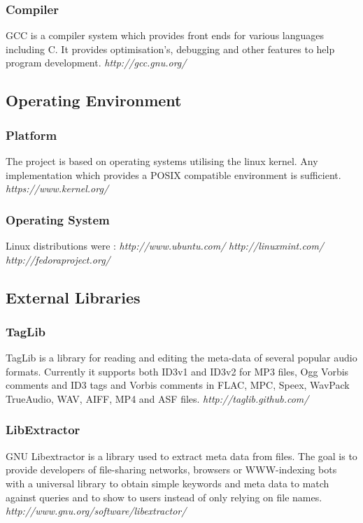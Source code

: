\subsubsection {Compiler}
GCC is a compiler system which provides front ends for various languages including C. It provides optimisation's, debugging and other features to help program development. \newline
\emph{http://gcc.gnu.org/}

\subsection {Operating Environment}
\subsubsection {Platform}
The project is based on operating systems utilising the linux kernel. Any implementation which provides a POSIX compatible environment is sufficient. \newline
\emph{https://www.kernel.org/}

\subsubsection {Operating System}
Linux distributions were : \newline
\emph{http://www.ubuntu.com/} \newline
\emph{http://linuxmint.com/} \newline
\emph{http://fedoraproject.org/}


\subsection {External Libraries}
\subsubsection{TagLib}
TagLib is a library for reading and editing the meta-data of several popular audio formats. Currently it supports both ID3v1 and ID3v2 for MP3 files, Ogg Vorbis comments and ID3 tags and Vorbis comments in FLAC, MPC, Speex, WavPack TrueAudio, WAV, AIFF, MP4 and ASF files. \newline
\emph{http://taglib.github.com/}

\subsubsection{LibExtractor}
GNU Libextractor is a library used to extract meta data from files. The goal is to provide developers of file-sharing networks, browsers or WWW-indexing bots with a universal library to obtain simple keywords and meta data to match against queries and to show to users instead of only relying on file names.  \newline
\emph{http://www.gnu.org/software/libextractor/}


